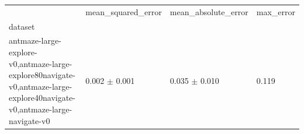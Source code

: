 \begin{tabular}{llll}
\toprule
 & mean_squared_error & mean_absolute_error & max_error \\
dataset &  &  &  \\
\midrule
antmaze-large-explore-v0,antmaze-large-explore80navigate-v0,antmaze-large-explore40navigate-v0,antmaze-large-navigate-v0 & 0.002 $\pm$ 0.001 & 0.035 $\pm$ 0.010 & 0.119 \\
\bottomrule
\end{tabular}
